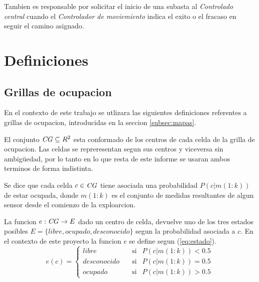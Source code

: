 Tambien es responsable por solicitar el inicio de una subasta al
\emph{Controlado central} cuando el \emph{Controlador de moviemiento} indica el
exito o el fracaso en seguir el camino asignado.



\section{Definiciones}
\subsection{Grillas de ocupacion}\label{subsec:Grilla}
En el contexto de este trabajo se utlizara las siguientes definiciones referentes a
grillas de ocupacion, introducidas en la seccion \ref{subsec:mapas}.

El conjunto $\mathit{CG}\subseteq R^2$ esta conformado de los centros de cada celda de la
grilla de ocupacion. Las celdas se repreresentan segun sus centros y viceversa
sin ambigüedad, por lo tanto en lo que resta de este informe se usaran ambos
terminos de forma indistinta.

Se dice que cada celda $c\in \mathit{CG}$ tiene asociada una probabilidad $P(c|m(1:k))$
de estar ocupada, donde $m(1:k)$ es el conjunto de medidas resultantes de algun
sensor desde el comienzo de la exploarcion.

La funcion $e : \mathit{CG} \rightarrow E$ dado un centro de celda, devuelve uno de los
tres estados posibles $E=\{libre, ocupado, desconocido\}$ segun la probabilidad
asociada a $c$. En el contexto de este proyecto la funcion $e$ se define segun
(\ref{eq:estado}).
\begin{equation} 
  e(c)= 
  \left \{ 
    \begin{aligned}
       libre       &\ \ \ \text{ si}& P(c|m(1:k)) < 0.5 \\
       desconocido &\ \ \ \text{ si}& P(c|m(1:k)) = 0.5 \\
       ocupado     &\ \ \ \text{ si}& P(c|m(1:k)) > 0.5
    \end{aligned}
  \right .
  \label{eq:estado}
\end{equation}

